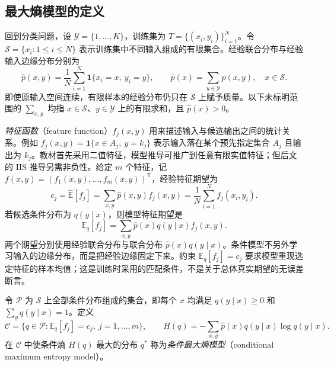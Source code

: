 \subsection{最大熵模型的定义}
\label{subsec:lh-maxent-definition}

回到分类问题，设 $\mathcal Y=\{1,\ldots,K\}$，训练集为 $T=\{(x_i,y_i)\}_{i=1}^N$。令 $\mathcal S=\{x_i:1\leq i\leq N\}$ 表示训练集中不同输入组成的有限集合。经验联合分布与经验输入边缘分布分别为
\begin{equation}
\widehat p(x,y)=\frac1N\sum_{i=1}^N\mathbf1\{x_i=x,\ y_i=y\},\qquad
\widehat p(x)=\sum_{y\in\mathcal Y}\widehat p(x,y),\quad x\in\mathcal S.
\label{eq:lh-empirical-distributions}
\end{equation}
即使原输入空间连续，有限样本的经验分布仍只在 $\mathcal S$ 上赋予质量。以下未标明范围的 $\sum_{x,y}$ 均指 $x\in\mathcal S$、$y\in\mathcal Y$ 上的有限求和，且 $\widehat p(x)>0$。

\emph{特征函数}（feature function）$f_j(x,y)$ 用来描述输入与候选输出之间的统计关系。例如 $f_j(x,y)=\mathbf1\{x\in A_j,\ y=k_j\}$ 表示输入落在某个预先指定集合 $A_j$ 且输出为 $k_j$。教材首先采用二值特征，模型推导可推广到任意有限实值特征；但后文的 IIS 推导另需非负性。给定 $m$ 个特征，记 $f(x,y)=(f_1(x,y),\ldots,f_m(x,y))^{\mathsf T}$，经验特征期望为
\begin{equation}
c_j=\widehat{\mathbb E}[f_j]
=\sum_{x,y}\widehat p(x,y)f_j(x,y)
=\frac1N\sum_{i=1}^Nf_j(x_i,y_i).
\label{eq:lh-empirical-moments}
\end{equation}
若候选条件分布为 $q(y\mid x)$，则模型特征期望是
\begin{equation}
\mathbb E_q[f_j]=\sum_{x,y}\widehat p(x)q(y\mid x)f_j(x,y).
\label{eq:lh-model-moments}
\end{equation}
两个期望分别使用经验联合分布与联合分布 $\widehat p(x)q(y\mid x)$。条件模型不另外学习输入的边缘分布，而是把经验边缘固定下来。约束 $\mathbb E_q[f_j]=c_j$ 要求模型重现选定特征的样本均值；这是训练时采用的匹配条件，不是关于总体真实期望的无误差断言。

\begin{definition}[条件最大熵模型]
\label{def:lh-conditional-maxent}
令 $\mathcal P$ 为 $\mathcal S$ 上全部条件分布组成的集合，即每个 $x$ 均满足 $q(y\mid x)\geq0$ 和 $\sum_yq(y\mid x)=1$。定义
\begin{equation}
\mathcal C=\{q\in\mathcal P:\mathbb E_q[f_j]=c_j,\ j=1,\ldots,m\},\qquad
H(q)=-\sum_{x,y}\widehat p(x)q(y\mid x)\log q(y\mid x).
\label{eq:lh-maxent-feasible-set}
\end{equation}
在 $\mathcal C$ 中使条件熵 $H(q)$ 最大的分布 $q^*$ 称为\emph{条件最大熵模型}（conditional maximum entropy model）。
\end{definition}

